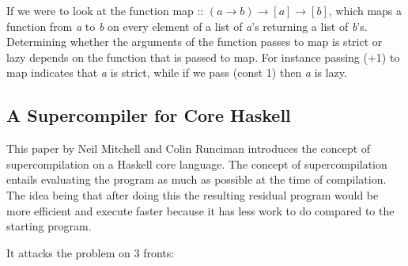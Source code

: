 \documentclass[11pt,twoside,a4paper]{article}
\begin{document}
If we were to look at the function map :: $(a \rightarrow b) \rightarrow [a] \rightarrow [b]$, which maps a function from \emph{a} to \emph{b} on every element of a list of \emph{a}'s returning a list of \emph{b}'s. Determining whether the arguments of the function passes to map is strict or lazy depends on the function that is passed to map. For instance passing (+1) to map indicates that \emph{a} is strict, while if we pass (const 1) then \emph{a} is lazy.

\subsection{A Supercompiler for Core Haskell}
This paper by Neil Mitchell and Colin Runciman \cite{super} introduces the concept of supercompilation on a Haskell core language. The concept of supercompilation entails evaluating the program as much as possible at the time of compilation. The idea being that after doing this the resulting residual program would be more efficient and execute faster because it has less work to do compared to the starting program.

It attacks the problem on 3 fronts:
\end{document}
